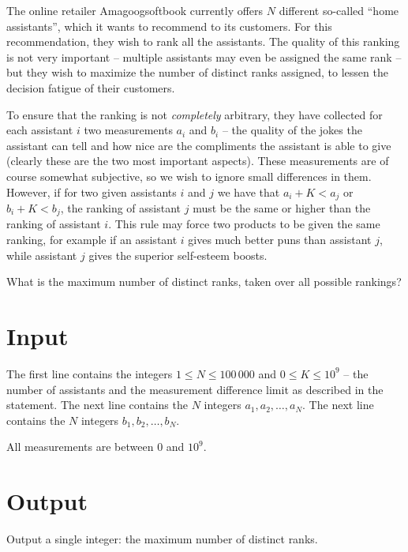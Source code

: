 The online retailer Amagoogsoftbook currently offers $N$ different so-called ``home assistants'', which it wants to recommend to its customers.
For this recommendation, they wish to rank all the assistants.
The quality of this ranking is not very important -- multiple assistants may even be assigned the same rank -- but they wish to maximize the number of distinct ranks assigned, to lessen the decision fatigue of their customers.

To ensure that the ranking is not \emph{completely} arbitrary, they have collected for each assistant $i$ two measurements $a_i$ and $b_i$ -- the quality of the jokes the assistant can tell and how nice are the compliments the assistant is able to give (clearly these are the two most important aspects).
These measurements are of course somewhat subjective, so we wish to ignore small differences in them.
However, if for two given assistants $i$ and $j$ we have that $a_i + K < a_j$ or $b_i + K < b_j$, the ranking of assistant $j$ must be the same or higher than the ranking of assistant $i$.
This rule may force two products to be given the same ranking, for example if an assistant $i$ gives much better puns than assistant $j$, while assistant $j$ gives the superior self-esteem boosts.

What is the maximum number of distinct ranks, taken over all possible rankings?

\section*{Input}
The first line contains the integers $1 \le N \le 100\,000$ and $0 \le K \le 10^9$ -- the number of assistants and the measurement difference limit as described in the statement.
The next line contains the $N$ integers $a_1, a_2, \dots, a_N$.
The next line contains the $N$ integers $b_1, b_2, \dots, b_N$.

All measurements are between $0$ and $10^9$.

\section*{Output}
Output a single integer: the maximum number of distinct ranks.
